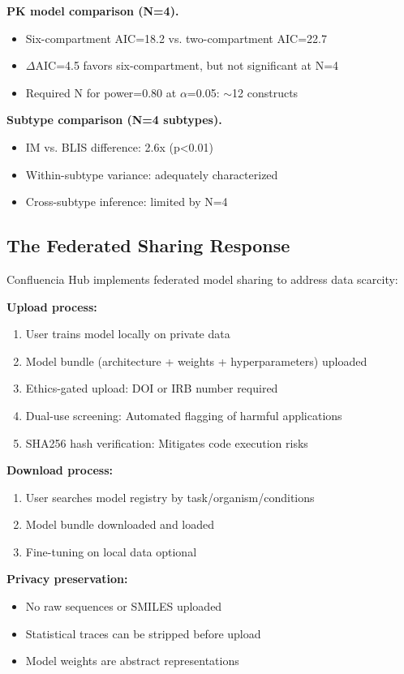 \documentclass[12pt]{article}
\begin{document}
\textbf{PK model comparison (N=4).}
\begin{itemize}
\item Six-compartment AIC=18.2 vs. two-compartment AIC=22.7
\item $\Delta$AIC=4.5 favors six-compartment, but not significant at N=4
\item Required N for power=0.80 at $\alpha$=0.05: $\sim$12 constructs
\end{itemize}

\textbf{Subtype comparison (N=4 subtypes).}
\begin{itemize}
\item IM vs. BLIS difference: 2.6x (p<0.01)
\item Within-subtype variance: adequately characterized
\item Cross-subtype inference: limited by N=4
\end{itemize}

\subsection{The Federated Sharing Response}

Confluencia Hub implements federated model sharing to address data scarcity:

\textbf{Upload process:}
\begin{enumerate}
\item User trains model locally on private data
\item Model bundle (architecture + weights + hyperparameters) uploaded
\item Ethics-gated upload: DOI or IRB number required
\item Dual-use screening: Automated flagging of harmful applications
\item SHA256 hash verification: Mitigates code execution risks
\end{enumerate}

\textbf{Download process:}
\begin{enumerate}
\item User searches model registry by task/organism/conditions
\item Model bundle downloaded and loaded
\item Fine-tuning on local data optional
\end{enumerate}

\textbf{Privacy preservation:}
\begin{itemize}
\item No raw sequences or SMILES uploaded
\item Statistical traces can be stripped before upload
\item Model weights are abstract representations
\end{itemize}
\end{document}
